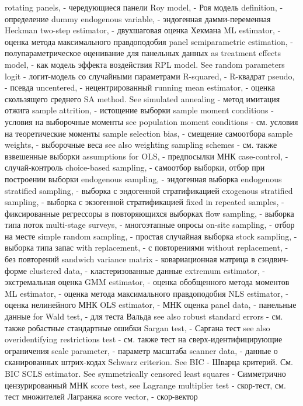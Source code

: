 rotating panels, - чередующиеся панели
Roy model, - Роя модель
definition, - определение
dummy endogenous variable, - эндогенная дамми-переменная
Heckman two-step estimator, - двухшаговая оценка Хекмана
ML estimator, - оценка метода максимального правдоподобия
panel semiparametric estimation, - полупараметрическое оценивание для панельных данных
as treatment effects model, - как модель эффекта воздействия
RPL model. See random parameters logit - логит-модель со случайными параметрами
R-squared, - R-квадрат
pseudo, - псевда
uncentered, - нецентрированный
running mean estimator, - оценка скользящего среднего
SA method. See simulated annealing - метод имитация отжига
sample attrition, - истощение выборки
sample moment conditions - условия на выборочные моменты
see population moment conditions - см. условия на теоретические моменты
sample selection bias, - смещение самоотбора
sample weights, - выборочные веса
see also weighting sampling schemes - см. также взвешенные выборки
assumptions for OLS, - предпосылки МНК
case-control, - случай-контроль
choice-based sampling, - самоотбор выборки, отбор при построении выборки
endogenous sampling, - эндогенная выборка
endogenous stratified sampling, - выборка с эндогенной стратификацией
exogenous stratified sampling, - выборка с экзогенной стратификацией
fixed in repeated samples,  - фиксированные регрессоры в повторяющихся выборках
flow sampling, - выборка типа поток
multi-stage surveys, - многоэтапные опросы
on-site sampling, - отбор на месте
simple random sampling, - простая случайная выборка
stock sampling, - выборка типа запас
with replacement, - с повторениями
without replacement, - без повторений
sandwich variance matrix - ковариационная матрица в сэндвич-форме
clustered data, - кластеризованные данные
extremum estimator, - экстремальная оценка
GMM estimator, - оценка обобщенного метода моментов
ML estimator, - оценка метода максимального правдоподобия
NLS estimator, - оценка нелинейного МНК
OLS estimator, - МНК оценка
panel data, - панельные данные
for Wald test, - для теста Вальда
see also robust standard errors - см. также робастные стандартные ошибки
Sargan test, - Саргана тест
see also overidentifying restrictions test - см. также тест на сверх-идентифицирующие ограничения
scale parameter, - параметр масштаба
scanner data, - данные о сканированных штрих-кодах
Schwarz criterion. See BIC - Шварца критерий. См. BIC
SCLS estimator. See symmetrically censored least squares - Симметрично цензурированный МНК
score test, see Lagrange multiplier test - скор-тест, см. тест множителей Лагранжа
score vector, - скор-вектор
